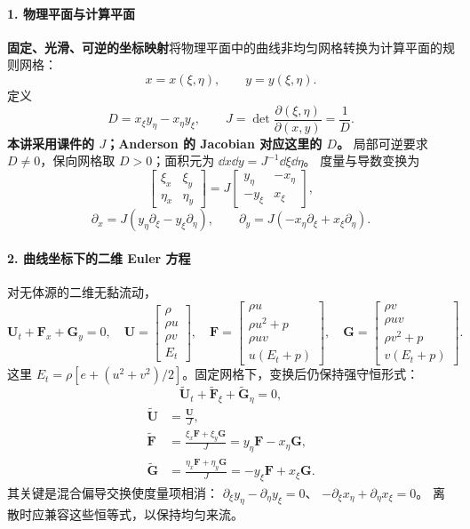 \paragraph{1. 物理平面与计算平面}
\textbf{固定、光滑、可逆的坐标映射}将物理平面中的曲线非均匀网格转换为计算平面的规则网格：
\[
 x=x(\xi,\eta),\qquad y=y(\xi,\eta).
\]
定义
\begin{equation}
 D=x_\xi y_\eta-x_\eta y_\xi,\qquad
 J=\det\frac{\partial(\xi,\eta)}{\partial(x,y)}=\frac1D.
 \label{eq:cfd-jacobian}
\end{equation}
\textbf{本讲采用课件的 $J$；Anderson 的 Jacobian 对应这里的 $D$。}
局部可逆要求 $D\ne0$，保向网格取 $D>0$；面积元为 $\dd x\dd y=J^{-1}\dd\xi\dd\eta$。
度量与导数变换为
\[
 \begin{bmatrix}\xi_x&\xi_y\\\eta_x&\eta_y\end{bmatrix}
 =J\begin{bmatrix}y_\eta&-x_\eta\\-y_\xi&x_\xi\end{bmatrix},
\]
\[
 \partial_x=J(y_\eta\partial_\xi-y_\xi\partial_\eta),\qquad
 \partial_y=J(-x_\eta\partial_\xi+x_\xi\partial_\eta).
\]

\paragraph{2. 曲线坐标下的二维 Euler 方程}
对无体源的二维无黏流动，
\[
 \mathbf U_t+\mathbf F_x+\mathbf G_y=0,
 \quad
 \mathbf U=\begin{bmatrix}\rho\\\rho u\\\rho v\\E_t\end{bmatrix},\quad
 \mathbf F=\begin{bmatrix}\rho u\\\rho u^2+p\\\rho uv\\u(E_t+p)\end{bmatrix},\quad
 \mathbf G=\begin{bmatrix}\rho v\\\rho uv\\\rho v^2+p\\v(E_t+p)\end{bmatrix}.
\]
这里 $E_t=\rho[e+(u^2+v^2)/2]$。固定网格下，变换后仍保持强守恒形式：
\begin{equation}
 \boxed{\widetilde{\mathbf U}_t+
        \widetilde{\mathbf F}_\xi+\widetilde{\mathbf G}_\eta=0},
 \label{eq:cfd-curvilinear-euler}
\end{equation}
\begin{align*}
 \widetilde{\mathbf U}&=\frac{\mathbf U}{J},\\
 \widetilde{\mathbf F}&=\frac{\xi_x\mathbf F+\xi_y\mathbf G}{J}
                  =y_\eta\mathbf F-x_\eta\mathbf G,\\
 \widetilde{\mathbf G}&=\frac{\eta_x\mathbf F+\eta_y\mathbf G}{J}
                  =-y_\xi\mathbf F+x_\xi\mathbf G.
\end{align*}
其关键是混合偏导交换使度量项相消：
$\partial_\xi y_\eta-\partial_\eta y_\xi=0$、
$-\partial_\xi x_\eta+\partial_\eta x_\xi=0$。
离散时应兼容这些恒等式，以保持均匀来流。

